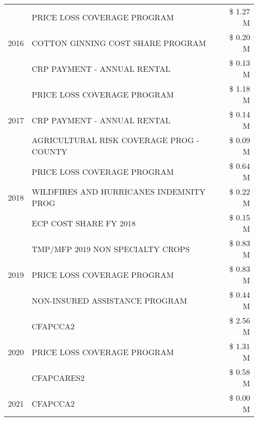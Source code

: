 \begin{tabular}{llr}
\cline{1-3}
\multirow[t]{3}{*}{2016} & PRICE LOSS COVERAGE PROGRAM                   & \$ 1.27 M \\
 & COTTON GINNING COST SHARE PROGRAM             & \$ 0.20 M \\
 & CRP PAYMENT - ANNUAL RENTAL                   & \$ 0.13 M \\
\cline{1-3}
\multirow[t]{3}{*}{2017} & PRICE LOSS COVERAGE PROGRAM & \$ 1.18 M \\
 & CRP PAYMENT - ANNUAL RENTAL & \$ 0.14 M \\
 & AGRICULTURAL RISK COVERAGE PROG - COUNTY & \$ 0.09 M \\
\cline{1-3}
\multirow[t]{3}{*}{2018} & PRICE LOSS COVERAGE PROGRAM & \$ 0.64 M \\
 & WILDFIRES AND HURRICANES INDEMNITY PROG & \$ 0.22 M \\
 & ECP COST SHARE FY 2018 & \$ 0.15 M \\
\cline{1-3}
\multirow[t]{3}{*}{2019} & TMP/MFP 2019 NON SPECIALTY CROPS & \$ 0.83 M \\
 & PRICE LOSS COVERAGE PROGRAM & \$ 0.83 M \\
 & NON-INSURED ASSISTANCE PROGRAM & \$ 0.44 M \\
\cline{1-3}
\multirow[t]{3}{*}{2020} & CFAPCCA2 & \$ 2.56 M \\
 & PRICE LOSS COVERAGE PROGRAM & \$ 1.31 M \\
 & CFAPCARES2 & \$ 0.58 M \\
\cline{1-3}
2021 & CFAPCCA2 & \$ 0.00 M \\
\cline{1-3}
\bottomrule
\end{tabular}
